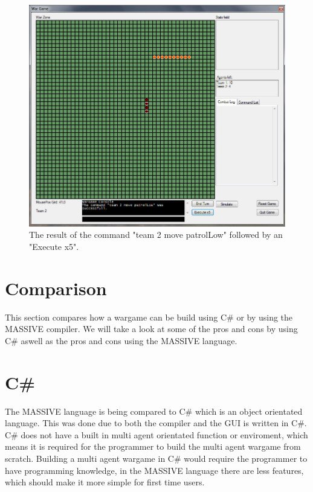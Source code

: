 \begin{figure}[h]%
\begin{center}
\includegraphics[scale=0.6]{Images/massive_patrollow.png}%
\end{center}
\caption{The result of the command "team 2 move patrolLow" followed by an "Execute x5".}%
\label{fig:winner}%
\end{figure}

\section{Comparison}
\indent This section compares how a wargame can be build using C\# or by using the MASSIVE compiler. We will take a look at some of the pros and cons by using C\#  aswell as the pros and cons using the MASSIVE language.

\section{C\#}
The MASSIVE language is being compared to C\# which is an object orientated language. This was done due to both the compiler and the GUI is written in C\#. C\# does not have a built in multi agent orientated function or enviroment, which means it is required for the programmer to build the multi agent wargame from scratch. Building a multi agent wargame in C\# would require the programmer to have programming knowledge, in the MASSIVE language there are less features, which should make it more simple for first time users.\\

